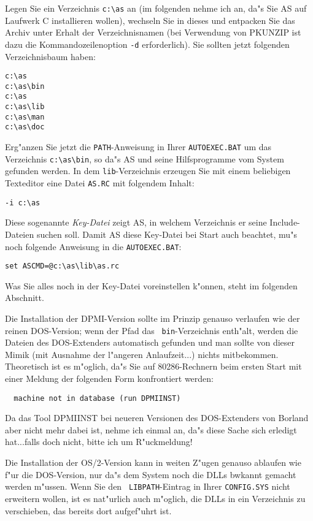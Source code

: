 \documentclass[12pt,a4paper,twoside]{report}
\newcommand{\tty}[1]{{\tt #1}}
\begin{document}
Legen Sie ein Verzeichnis \verb!c:\as! an (im folgenden nehme ich an,
da"s Sie AS auf Laufwerk C installieren wollen), wechseln Sie in dieses
und entpacken Sie das Archiv unter Erhalt der Verzeichnisnamen (bei
Verwendung von PKUNZIP ist dazu die Kommandozeilenoption \verb!-d!
erforderlich).  Sie sollten jetzt folgenden Verzeichnisbaum haben:
\begin{verbatim}
c:\as
c:\as\bin
c:\as
c:\as\lib
c:\as\man
c:\as\doc
\end{verbatim}
Erg"anzen Sie jetzt die \tty{PATH}-Anweisung in Ihrer \tty{AUTOEXEC.BAT}
um das Verzeichnis \verb!c:\as\bin!, so da"s AS und seine Hilfsprogramme
vom System gefunden werden.  In dem \tty{lib}-Verzeichnis erzeugen Sie
mit einem beliebigen Texteditor eine Datei \tty{AS.RC} mit folgendem 
Inhalt:
\begin{verbatim}
-i c:\as
\end{verbatim}
Diese sogenannte {\em Key-Datei} zeigt AS, in welchem Verzeichnis er seine 
Include-Dateien suchen soll.  Damit AS diese Key-Datei bei Start 
auch beachtet, mu"s noch folgende Anweisung in die \tty{AUTOEXEC.BAT}:
\begin{verbatim}
set ASCMD=@c:\as\lib\as.rc
\end{verbatim}
Was Sie alles noch in der Key-Datei voreinstellen k"onnen, steht im
folgenden Abschnitt.  

Die Installation der DPMI-Version  sollte im Prinzip
genauso verlaufen wie der reinen DOS-Version; wenn der Pfad das {\tt
bin}-Verzeichnis enth"alt, werden die Dateien des DOS-Extenders
automatisch gefunden und man sollte von dieser Mimik (mit Ausnahme der
l"angeren Anlaufzeit...) nichts mitbekommen.  Theoretisch ist es m"oglich,
da"s Sie auf 80286-Rechnern beim ersten Start mit einer Meldung der
folgenden Form konfrontiert werden:
\begin{verbatim}
  machine not in database (run DPMIINST)
\end{verbatim}
Da das Tool DPMIINST bei neueren Versionen des DOS-Extenders von Borland
aber nicht mehr dabei ist, nehme ich einmal an, da"s diese Sache sich
erledigt hat...falls doch nicht, bitte ich um R"uckmeldung!

Die Installation der OS/2-Version  kann in weiten
Z"ugen genauso ablaufen wie f"ur die DOS-Version, nur da"s dem System noch
die DLLs bwkannt gemacht werden m"ussen.  Wenn Sie den {\tt
LIBPATH}-Eintrag in Ihrer {\tt CONFIG.SYS} nicht erweitern wollen, ist es
nat"urlich auch m"oglich, die DLLs in ein Verzeichnis zu verschieben, das
bereits dort aufgef"uhrt ist.
\end{document}
